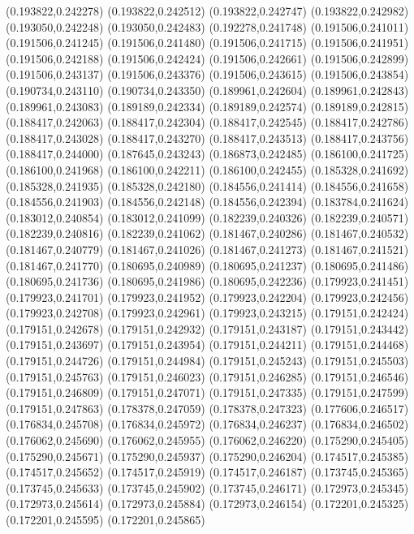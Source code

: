(0.193822,0.242278)
(0.193822,0.242512)
(0.193822,0.242747)
(0.193822,0.242982)
(0.193050,0.242248)
(0.193050,0.242483)
(0.192278,0.241748)
(0.191506,0.241011)
(0.191506,0.241245)
(0.191506,0.241480)
(0.191506,0.241715)
(0.191506,0.241951)
(0.191506,0.242188)
(0.191506,0.242424)
(0.191506,0.242661)
(0.191506,0.242899)
(0.191506,0.243137)
(0.191506,0.243376)
(0.191506,0.243615)
(0.191506,0.243854)
(0.190734,0.243110)
(0.190734,0.243350)
(0.189961,0.242604)
(0.189961,0.242843)
(0.189961,0.243083)
(0.189189,0.242334)
(0.189189,0.242574)
(0.189189,0.242815)
(0.188417,0.242063)
(0.188417,0.242304)
(0.188417,0.242545)
(0.188417,0.242786)
(0.188417,0.243028)
(0.188417,0.243270)
(0.188417,0.243513)
(0.188417,0.243756)
(0.188417,0.244000)
(0.187645,0.243243)
(0.186873,0.242485)
(0.186100,0.241725)
(0.186100,0.241968)
(0.186100,0.242211)
(0.186100,0.242455)
(0.185328,0.241692)
(0.185328,0.241935)
(0.185328,0.242180)
(0.184556,0.241414)
(0.184556,0.241658)
(0.184556,0.241903)
(0.184556,0.242148)
(0.184556,0.242394)
(0.183784,0.241624)
(0.183012,0.240854)
(0.183012,0.241099)
(0.182239,0.240326)
(0.182239,0.240571)
(0.182239,0.240816)
(0.182239,0.241062)
(0.181467,0.240286)
(0.181467,0.240532)
(0.181467,0.240779)
(0.181467,0.241026)
(0.181467,0.241273)
(0.181467,0.241521)
(0.181467,0.241770)
(0.180695,0.240989)
(0.180695,0.241237)
(0.180695,0.241486)
(0.180695,0.241736)
(0.180695,0.241986)
(0.180695,0.242236)
(0.179923,0.241451)
(0.179923,0.241701)
(0.179923,0.241952)
(0.179923,0.242204)
(0.179923,0.242456)
(0.179923,0.242708)
(0.179923,0.242961)
(0.179923,0.243215)
(0.179151,0.242424)
(0.179151,0.242678)
(0.179151,0.242932)
(0.179151,0.243187)
(0.179151,0.243442)
(0.179151,0.243697)
(0.179151,0.243954)
(0.179151,0.244211)
(0.179151,0.244468)
(0.179151,0.244726)
(0.179151,0.244984)
(0.179151,0.245243)
(0.179151,0.245503)
(0.179151,0.245763)
(0.179151,0.246023)
(0.179151,0.246285)
(0.179151,0.246546)
(0.179151,0.246809)
(0.179151,0.247071)
(0.179151,0.247335)
(0.179151,0.247599)
(0.179151,0.247863)
(0.178378,0.247059)
(0.178378,0.247323)
(0.177606,0.246517)
(0.176834,0.245708)
(0.176834,0.245972)
(0.176834,0.246237)
(0.176834,0.246502)
(0.176062,0.245690)
(0.176062,0.245955)
(0.176062,0.246220)
(0.175290,0.245405)
(0.175290,0.245671)
(0.175290,0.245937)
(0.175290,0.246204)
(0.174517,0.245385)
(0.174517,0.245652)
(0.174517,0.245919)
(0.174517,0.246187)
(0.173745,0.245365)
(0.173745,0.245633)
(0.173745,0.245902)
(0.173745,0.246171)
(0.172973,0.245345)
(0.172973,0.245614)
(0.172973,0.245884)
(0.172973,0.246154)
(0.172201,0.245325)
(0.172201,0.245595)
(0.172201,0.245865)
